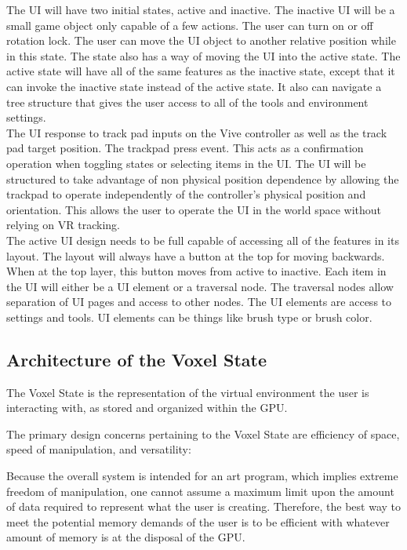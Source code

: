 \documentclass[onecolumn, draftclsnofoot,10pt, compsoc]{IEEEtran}
\begin{document}
The UI will have two initial states, active and inactive. The inactive UI will be a small game object only capable of a few actions. The user can turn on or off rotation lock. The user can move the UI object to another relative position while in this state. The state also has a way of moving the UI into the active state. 
The active state will have all of the same features as the inactive state, except that it can invoke the inactive state instead of the active state. It also can navigate a tree structure that gives the user access to all of the tools and environment settings. \\

The UI response to track pad inputs on the Vive controller as well as the track pad target position. The trackpad press event. This acts as a confirmation operation when toggling states or selecting items in the UI. The UI will be structured to take advantage of non physical position dependence by allowing the trackpad to operate independently of the controller's physical position and orientation. This allows the user to operate the UI in the world space without relying on VR tracking. \\

The active UI design needs to be full capable of accessing all of the features in its layout. The layout will always have a button at the top for moving backwards. When at the top layer, this button moves from active to inactive. Each item in the UI will either be a UI element or a traversal node. The traversal nodes allow separation of UI pages and access to other nodes. The UI elements are access to settings and tools. UI elements can be things like brush type or brush color. \\



\subsection{Architecture of the Voxel State}

The Voxel State is the representation of the virtual environment the user is interacting with, as stored and organized within the GPU.

The primary design concerns pertaining to the Voxel State are efficiency of space, speed of manipulation, and versatility: 

Because the overall system is intended for an art program, which implies extreme freedom of manipulation, one cannot assume a maximum limit upon the amount of data required to represent what the user is creating. Therefore, the best way to meet the potential memory demands of the user is to be efficient with whatever amount of memory is at the disposal of the GPU. 
\end{document}
